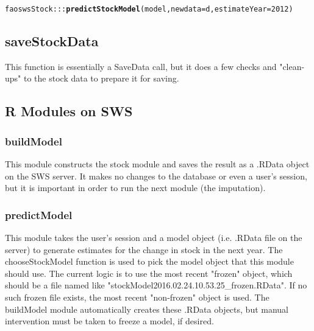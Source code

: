 \documentclass[nojss]{jss}\usepackage[]{graphicx}\usepackage[]{color}
\makeatletter
\newcommand{\hlnum}[1]{\textcolor[rgb]{0.686,0.059,0.569}{#1}}%
\newcommand{\hlopt}[1]{\textcolor[rgb]{0,0,0}{#1}}%
\newcommand{\hlstd}[1]{\textcolor[rgb]{0.345,0.345,0.345}{#1}}%
\newcommand{\hlkwc}[1]{\textcolor[rgb]{0.333,0.667,0.333}{#1}}%
\newcommand{\hlkwd}[1]{\textcolor[rgb]{0.737,0.353,0.396}{\textbf{#1}}}%
\newenvironment{kframe}{%
 \def\at@end@of@kframe{}%
 \ifinner\ifhmode%
  \def\at@end@of@kframe{\end{minipage}}%
  \begin{minipage}{\columnwidth}%
 \fi\fi%
 \def\FrameCommand##1{\hskip\@totalleftmargin \hskip-\fboxsep
 \colorbox{shadecolor}{##1}\hskip-\fboxsep
     \hskip-\linewidth \hskip-\@totalleftmargin \hskip\columnwidth}%
 \MakeFramed {\advance\hsize-\width
   \@totalleftmargin\z@ \linewidth\hsize
   \@setminipage}}%
 {\par\unskip\endMakeFramed%
 \at@end@of@kframe}
\newenvironment{knitrout}{}{} %
\makeatother
\begin{document}
\begin{knitrout}
\begin{kframe}
{\ttfamily\noindent\bfseries{}}\begin{alltt}
\hlstd{faoswsStock}\hlopt{:::}\hlkwd{predictStockModel}\hlstd{(model,} \hlkwc{newdata} \hlstd{= d,} \hlkwc{estimateYear} \hlstd{=} \hlnum{2012}\hlstd{)}
\end{alltt}


{\ttfamily\noindent\bfseries{}}\end{kframe}
\end{knitrout}

\subsection{saveStockData}

This function is essentially a SaveData call, but it does a few checks and "clean-ups" to the stock data to prepare it for saving.

\subsection{R Modules on SWS}

\subsubsection{buildModel}

This module constructs the stock module and saves the result as a .RData object on the SWS server.  It makes no changes to the database or even a user's session, but it is important in order to run the next module (the imputation).

\subsubsection{predictModel}

This module takes the user's session and a model object (i.e. .RData file on the server) to generate estimates for the change in stock in the next year.  The chooseStockModel function is used to pick the model object that this module should use.  The current logic is to use the most recent "frozen" object, which should be a file named like "stockModel2016.02.24.10.53.25\_frozen.RData".  If no such frozen file exists, the most recent "non-frozen" object is used.  The buildModel module automatically creates these .RData objects, but manual intervention must be taken to freeze a model, if desired.
\end{document}
